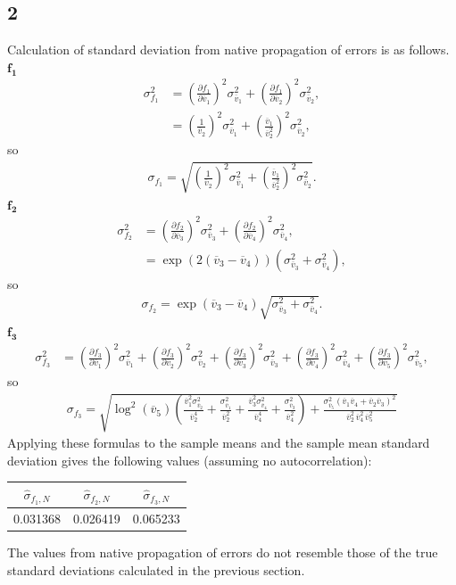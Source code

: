 \documentclass[singlepage,notitlepage,nofootinbib,11pt]{revtex4-1}
\newcommand{\eq}[1]{\begin{align*}#1\end{align*}}
\def\l{\left}
\def\r{\right}
\begin{document}
\subsection{2}
Calculation of standard deviation from native propagation of errors is as follows.
$\mathbf{f_1}$
\eq{
\sigma_{f_1}^2 &= \l(\frac{\partial f_1}{\partial \overline{v}_1}\r)^2\sigma_{\overline{v}_1}^2 + \l(\frac{\partial f_1}{\partial \overline{v}_2}\r)^2\sigma_{\overline{v}_2}^2,\\
&=\l(\frac{1}{\overline{v}_2}\r)^2\sigma_{\overline{v}_1}^2 + \l(\frac{\overline{v}_1}{\overline{v}_2^2}\r)^2\sigma_{\overline{v}_2}^2,
}
so
\eq{
\boxed{\sigma_{f_1}=\sqrt{\l(\frac{1}{\overline{v}_2}\r)^2\sigma_{\overline{v}_1}^2 + \l(\frac{\overline{v}_1}{\overline{v}_2^2}\r)^2\sigma_{\overline{v}_2}^2}.}
}
$\mathbf{f_2}$
\eq{\sigma_{f_2}^2 &= \l(\frac{\partial f_2}{\partial \overline{v}_3}\r)^2\sigma_{\overline{v}_3}^2 + \l(\frac{\partial f_2}{\partial \overline{v}_4}\r)^2\sigma_{\overline{v}_4}^2,\\ 
  &=\exp\l(2(\overline{v}_3-\overline{v}_4)\r)\l(\sigma_{\overline{v}_3}^2+\sigma_{\overline{v}_4}^2\r),
}
so
\eq{
\boxed{ \sigma_{f_2} = \exp\l(\overline{v}_3-\overline{v}_4\r)\sqrt{\sigma_{\overline{v}_3}^2+\sigma_{\overline{v}_4}^2}}.
}
$\mathbf{f_3}$
\eq{
\sigma_{f_3}^2 &= \l(\frac{\partial f_3}{\partial \overline{v}_1}\r)^2\sigma_{\overline{v}_1}^2 + \l(\frac{\partial f_3}{\partial \overline{v}_2}\r)^2\sigma_{\overline{v}_2}^2 + \l(\frac{\partial f_3}{\partial \overline{v}_3}\r)^2\sigma_{\overline{v}_3}^2 + \l(\frac{\partial f_3}{\partial \overline{v}_4}\r)^2\sigma_{\overline{v}_4}^2 + \l(\frac{\partial f_3}{\partial \overline{v}_5}\r)^2\sigma_{\overline{v}_5}^2,
}
so
\eq{
\boxed{\sigma_{f_3} = \sqrt{\log^2(\overline{v}_5) \left(\frac{\overline{v}_1^2 \sigma_{\overline{v}_2}^2}{\overline{v}_2^4}+\frac{\sigma_{\overline{v}_1}^2}{\overline{v}_2^2}+\frac{\overline{v}_3^2 \sigma_{\overline{v}_4}^2}{\overline{v}_4^4}+\frac{\sigma_{\overline{v}_3}^2}{\overline{v}_4^2}\right)+\frac{\sigma_{\overline{v}_5}^2 (\overline{v}_1 \overline{v}_4+\overline{v}_2 \overline{v}_3)^2}{\overline{v}_2^2\,\overline{v}_4^2\,\overline{v}_5^2}}}
}
Applying these formulas to the sample means and the sample mean standard deviation gives the following values (assuming no autocorrelation):
\begin{center}
\begin{tabular}{| c | c | c |}
\hline
$\hat{\sigma}_{f_1,N}$ & $\hat{\sigma}_{f_2,N}$ & $\hat{\sigma}_{f_3,N}$ \\\hline\hline
0.031368 & 0.026419 & 0.065233 \\ \hline
\end{tabular}
\end{center}
The values from native propagation of errors do not resemble those of the true standard deviations calculated in the previous section.
\end{document}
